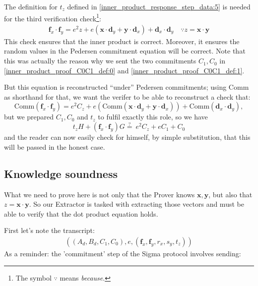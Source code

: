 \documentclass[10pt,a4paper]{article}
\begin{document}
The definition for $t_z$ defined in \eqref{inner_product_response_step_data:5} is needed for the third verification check\footnote{The symbol $\because$ means \emph{because}.}:
\begin{align}
\mathbf{f}_x \cdot \mathbf{f}_y = e^2 z + e\left(\mathbf{x} \cdot \mathbf{d}_y + \mathbf{y} \cdot \mathbf{d}_x \right) + \mathbf{d}_x \cdot \mathbf{d}_y \quad \because z = \mathbf{x} \cdot \mathbf{y}
\end{align}
This check ensures that the inner product is correct. Moreover, it ensures the random values in 
the Pedersen commitment equation will be correct. Note that this was actually 
the reason why we sent the two commitments $C_1, C_0$ in \eqref{inner_product_proof_C0C1_def:0} and \eqref{inner_product_proof_C0C1_def:1}.

But this equation is reconstructed ``under'' Pedersen commitments; using
Comm as shorthand for that, we want the verifer to be able to
reconstruct a check that:
\[\textrm{Comm}\left(\mathbf{f}_x \cdot \mathbf{f}_y\right) = e^2 C_z + e\left(\textrm{Comm}\left(\mathbf{x} \cdot \mathbf{d}_y + \mathbf{y} \cdot \mathbf{d}_x\right)\right) + \textrm{Comm}\left(\mathbf{d}_x \cdot \mathbf{d}_y \right),\]
but we prepared $C_1, C_0$ and $t_z$ to fulfil exactly this role, so we have
\[t_z H + \left(\mathbf{f}_x \cdot \mathbf{f}_y\right)G \stackrel{?}{=} \ e^2 C_z + eC_1 + C_0\]
and the reader can now easily check for himself, by simple substitution,
that this will be passed in the honest case.

\hypertarget{knowledge-soundness}{%
\subsection[Knowledge
soundness]{\texorpdfstring{\protect\hypertarget{anchor-39}{}{}Knowledge
soundness}{Knowledge soundness}}\label{knowledge-soundness}}

What we need to prove here is not only that the Prover knows $\mathbf{x}, \mathbf{y}$, but also
that $z = \mathbf{x}\cdot \mathbf{y}$. So our Extractor is tasked with extracting those vectors and must
be able to verify that the dot product equation holds.

First let's note the transcript: 
\begin{align*}
\left((A_d, B_d, C_1, C_0), e, (\textbf{f}_x, \textbf{f}_y, r_x, s_y, t_z)\right)
\end{align*}
As a reminder: the 'commitment' step of the Sigma protocol involves sending:
\end{document}
